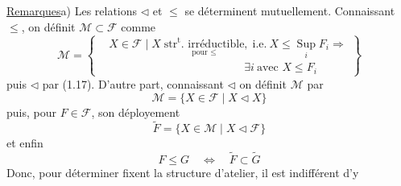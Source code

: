 \uline{Remarques}\quad a) Les relations $\triangleleft$ et $\leq$ se déterminent mutuellement. Connaissant $\leq$, on définit $\mathcal{M}\subset\mathcal{F}$ comme
\[
\mathcal{M}=\left\{\begin{aligned}
&X\in\mathcal{F}\mid X\;
\underset{\text{pour }\leq}{\text{$\mathrm{str}^{\mathrm{t}}$. irréductible}},\;
\text{i.e.}\ X\leq\mathop{\mathrm{Sup}}\limits_i F_i\Rightarrow\\
&\hspace{12em}\exists i\ \text{avec }X\leq F_i
\end{aligned}\right\}
\tag*{(1.20)}
\]
puis $\triangleleft$ par (1.17).
 D'autre part, connaissant $\triangleleft$ on définit $\mathcal{M}$ par
\[
\mathcal{M}=\{X\in\mathcal{F}\mid X\triangleleft X\} \tag*{(1.21)}
\]
puis, pour $F\in\mathcal{F}$, son déployement
\[
\widetilde F=\{X\in\mathcal{M}\mid X\triangleleft\mathcal{F}\} \tag*{(1.22)}
\]
et enfin
\[
F\leq G\quad\Longleftrightarrow\quad\widetilde F\subset\widetilde G \tag*{(1,23)}
\]
Donc, pour déterminer   fixent la structure d'atelier, il est indifférent d'y
